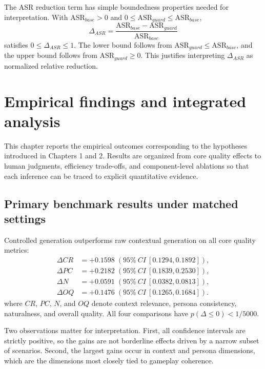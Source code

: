 ﻿\documentclass[a4paper,12pt]{article}
\newcommand{\BootstrapSamples}{5000}
\begin{document}
The ASR reduction term has simple boundedness properties needed for interpretation. With \(\mathrm{ASR}_{base}>0\) and \(0\le \mathrm{ASR}_{guard}\le \mathrm{ASR}_{base}\),
\begin{equation}
\Delta_{ASR}=\frac{\mathrm{ASR}_{base}-\mathrm{ASR}_{guard}}{\mathrm{ASR}_{base}}
\end{equation}
satisfies \(0\le\Delta_{ASR}\le1\). The lower bound follows from \(\mathrm{ASR}_{guard}\le\mathrm{ASR}_{base}\), and the upper bound follows from \(\mathrm{ASR}_{guard}\ge0\). This justifies interpreting \(\Delta_{ASR}\) as normalized relative reduction.

\section{Empirical findings and integrated analysis}
This chapter reports the empirical outcomes corresponding to the hypotheses introduced in Chapters 1 and 2. Results are organized from core quality effects to human judgments, efficiency trade-offs, and component-level ablations so that each inference can be traced to explicit quantitative evidence.
\subsection{Primary benchmark results under matched settings}

Controlled generation outperforms raw contextual generation on all core quality metrics:
\begin{equation*}
\begin{aligned}
\Delta CR &= +0.1598\; (95\%\ CI\ [0.1294,0.1892]),\\
\Delta PC &= +0.2182\; (95\%\ CI\ [0.1839,0.2530]),\\
\Delta N  &= +0.0591\; (95\%\ CI\ [0.0382,0.0813]),\\
\Delta OQ &= +0.1476\; (95\%\ CI\ [0.1265,0.1684]).
\end{aligned}
\end{equation*}
where \(CR\), \(PC\), \(N\), and \(OQ\) denote context relevance, persona consistency, naturalness, and overall quality.
All four comparisons have \(p(\Delta\le 0)<1/\BootstrapSamples\).

Two observations matter for interpretation. First, all confidence intervals are strictly positive, so the gains are not borderline effects driven by a narrow subset of scenarios. Second, the largest gains occur in context and persona dimensions, which are the dimensions most closely tied to gameplay coherence.
\end{document}

